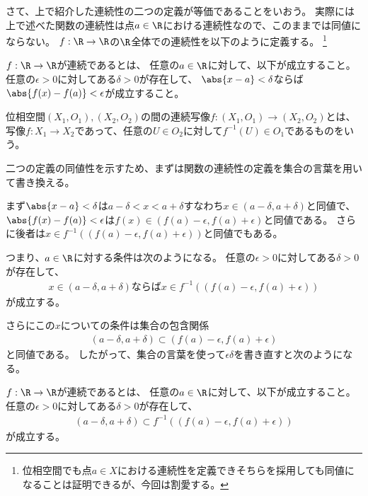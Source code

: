 \documentclass[uplatex]{jsarticle}
\begin{document}
さて、上で紹介した連続性の二つの定義が等価であることをいおう。
実際には上で述べた関数の連続性は点$a\in\R$における連続性なので、このままでは同値にならない。
$f:\R\to\R$の$\R$全体での連続性を以下のように定義する。
\footnote{位相空間でも点$a\in X$における連続性を定義できそちらを採用しても同値になることは証明できるが、今回は割愛する。}

\begin{dfn}[関数の連続性]
  $f:\R \to \R$が連続であるとは、
  任意の$a\in\R$に対して、以下が成立すること。
  任意の$\epsilon>0$に対してある$\delta>0$が存在して、
  $\abs{x-a}<\delta$ならば$\abs{f(x)-f(a)}<\epsilon$が成立すること。
\end{dfn}

\begin{dfn}[位相空間の間の写像の連続性]
  位相空間$(X_1,O_1), (X_2,O_2)$の間の連続写像$f:(X_1,O_1)\to(X_2,O_2)$とは、
  写像$f:X_1\to X_2$であって、任意の$U\in O_2$に対して$f^{-1}(U)\in O_1$であるものをいう。
\end{dfn}

二つの定義の同値性を示すため、まずは関数の連続性の定義を集合の言葉を用いて書き換える。

まず$\abs{x-a}<\delta$は$a-\delta<x<a+\delta$すなわち$x\in(a-\delta,a+\delta)$と同値で、
$\abs{f(x)-f(a)}<\epsilon$は$f(x)\in(f(a)-\epsilon,f(a)+\epsilon)$と同値である。
さらに後者は$x\in f^{-1}((f(a)-\epsilon,f(a)+\epsilon))$と同値でもある。

つまり、$a\in\R$に対する条件は次のようになる。
任意の$\epsilon>0$に対してある$\delta>0$が存在して、
\begin{align*}
  x\in(a-\delta,a+\delta)\mbox{ならば}x\in f^{-1}((f(a)-\epsilon,f(a)+\epsilon))
\end{align*}
が成立する。

さらにこの$x$についての条件は集合の包含関係
\begin{align*}
  (a-\delta,a+\delta)\subset(f(a)-\epsilon,f(a)+\epsilon)
\end{align*}
と同値である。
したがって、集合の言葉を使って$\epsilon\delta$を書き直すと次のようになる。

\begin{dfn}[関数の連続性]
  $f:\R\to\R$が連続であるとは、
  任意の$a\in\R$に対して、以下が成立すること。
  任意の$\epsilon>0$に対してある$\delta>0$が存在して、
  \begin{align*}
    (a-\delta,a+\delta)\subset f^{-1}((f(a)-\epsilon,f(a)+\epsilon))
  \end{align*}
  が成立する。
\end{dfn}
\end{document}

